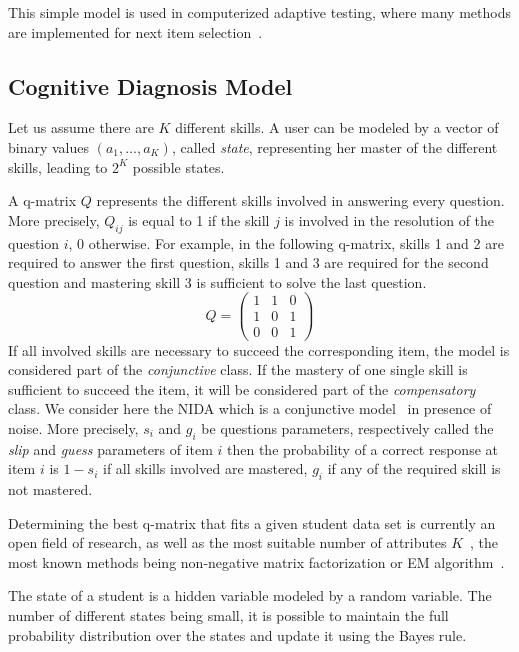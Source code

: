 \documentclass{sig-alternate}
\begin{document}
This simple model is used in computerized adaptive testing, where many methods are implemented for next item selection~\citep{MagisRaiche2012}.

\subsection{Cognitive Diagnosis Model}

Let us assume there are $K$ different skills. A user can be modeled by a vector of binary values $(a_1, \ldots, a_K)$, called \emph{state}, representing her master of the different skills, leading to $2^K$ possible states.

A q-matrix $Q$ \citep{Tatsuoka1983} represents the different skills involved in answering every question. More precisely, $Q_{ij}$ is equal to 1 if the skill $j$ is involved in the resolution of the question $i$, 0 otherwise. For example, in the following q-matrix, skills 1 and 2 are required to answer the first question, skills 1 and 3 are required for the second question and mastering skill 3 is sufficient to solve the last question.
\[ Q = \left(\begin{array}{lll}
1 & 1 & 0\\
1 & 0 & 1\\
0 & 0 & 1
\end{array}\right) \]
If all involved skills are necessary to succeed the corresponding item, the model is considered part of the \emph{conjunctive} class. 
If the mastery of one single skill is sufficient to succeed the item, it will be considered part of the \emph{compensatory} class. We consider here the NIDA which is a conjunctive model~\citep{Desmarais2012} in presence of noise. More precisely, $s_i$ and $g_i$ be questions parameters, respectively called the \emph{slip} and \emph{guess} parameters of item $i$ then the probability of a correct response at item $i$ is $1 - s_i$ if all skills involved are mastered, $g_i$ if any of the required skill is not mastered.

Determining the best q-matrix that fits a given student data set is currently an open field of research, as well as the most suitable number of attributes $K$~\citep{Huebner2010}, the most known methods being non-negative matrix factorization or EM algorithm~\citep{Huebner2010}. 

The state of a student is a hidden variable modeled by a random variable. The number of different states being small, it is possible to maintain the full probability distribution over the states and update it using the Bayes rule.
\end{document}
